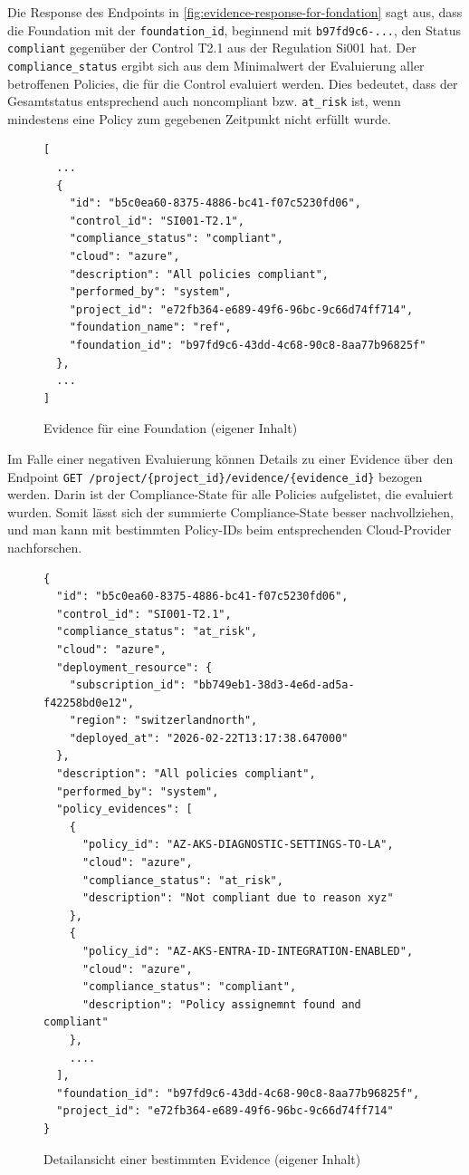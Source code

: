 Die Response des Endpoints in \autoref{fig:evidence-response-for-fondation} sagt aus, dass die Foundation mit der \texttt{foundation\_id}, beginnend mit \texttt{b97fd9c6-...}, den Status \texttt{compliant} gegenüber der Control T2.1 aus der Regulation Si001 hat. Der \texttt{compliance\_status} ergibt sich aus dem Minimalwert der Evaluierung aller betroffenen Policies, die für die Control evaluiert werden. Dies bedeutet, dass der Gesamtstatus entsprechend auch noncompliant bzw. \texttt{at\_risk} ist, wenn mindestens eine Policy zum gegebenen Zeitpunkt nicht erfüllt wurde.

\begin{figure}[H]
\centering
\begin{lstlisting}
[
  ...
  {
    "id": "b5c0ea60-8375-4886-bc41-f07c5230fd06",
    "control_id": "SI001-T2.1",
    "compliance_status": "compliant",
    "cloud": "azure",
    "description": "All policies compliant",
    "performed_by": "system",
    "project_id": "e72fb364-e689-49f6-96bc-9c66d74ff714",
    "foundation_name": "ref",
    "foundation_id": "b97fd9c6-43dd-4c68-90c8-8aa77b96825f"
  },
  ...
]
\end{lstlisting}
\caption{Evidence für eine Foundation (eigener Inhalt)}
\label{fig:evidence-response-for-fondation} 
\end{figure}

Im Falle einer negativen Evaluierung können Details zu einer Evidence über den Endpoint \texttt{GET /project/\{project\_id\}/evidence/\{evidence\_id\}} bezogen werden. Darin ist der Compliance-State für alle Policies aufgelistet, die evaluiert wurden. Somit lässt sich der summierte Compliance-State besser nachvollziehen, und man kann mit bestimmten Policy-IDs beim entsprechenden Cloud-Provider nachforschen.

\begin{figure}[H]
\centering
\begin{lstlisting}
{
  "id": "b5c0ea60-8375-4886-bc41-f07c5230fd06",
  "control_id": "SI001-T2.1",
  "compliance_status": "at_risk",
  "cloud": "azure",
  "deployment_resource": {
    "subscription_id": "bb749eb1-38d3-4e6d-ad5a-f42258bd0e12",
    "region": "switzerlandnorth",
    "deployed_at": "2026-02-22T13:17:38.647000"
  },
  "description": "All policies compliant",
  "performed_by": "system",
  "policy_evidences": [
    {
      "policy_id": "AZ-AKS-DIAGNOSTIC-SETTINGS-TO-LA",
      "cloud": "azure",
      "compliance_status": "at_risk",
      "description": "Not compliant due to reason xyz"
    },
    {
      "policy_id": "AZ-AKS-ENTRA-ID-INTEGRATION-ENABLED",
      "cloud": "azure",
      "compliance_status": "compliant",
      "description": "Policy assignemnt found and compliant"
    },
    ....
  ],
  "foundation_id": "b97fd9c6-43dd-4c68-90c8-8aa77b96825f",
  "project_id": "e72fb364-e689-49f6-96bc-9c66d74ff714"
}
\end{lstlisting}
\caption{Detailansicht einer bestimmten Evidence (eigener Inhalt)}
\label{fig:evidence-detail-response-for-foundation} 
\end{figure}


